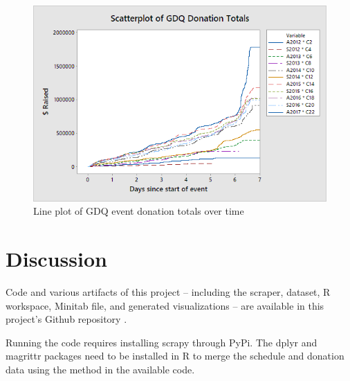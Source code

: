 \documentclass[journal]{IEEEtran}
\begin{document}
\begin{figure}
	\centering
	\includegraphics[scale=0.55]{GDQScatterplot}
	\caption{Line plot of GDQ event donation totals over time}
\end{figure}


\section{Discussion}

Code and various artifacts of this project -- including the scraper, dataset, R workspace, Minitab file, and generated visualizations -- are available in this project's Github repository \cite{gdqgit}.

Running the code requires installing scrapy through PyPi. The dplyr and magrittr packages need to be installed in R to merge the schedule and donation data using the method in the available code.



%
%
\end{document}
